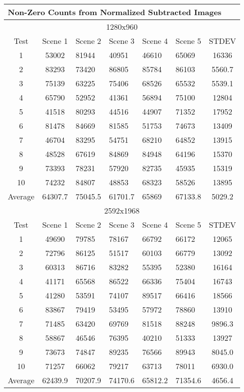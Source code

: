 \begin{table}
\begin{tabular}{| c | c | l | l | l | l | c | }
\hline
\multicolumn{7}{|l|}{\bf Non-Zero Counts from Normalized Subtracted Images} \\
\hline
\hline
\multicolumn{7}{|c|}{1280x960}\\
\hline
Test	&Scene 1	&Scene 2	&Scene 3	&Scene 4	&Scene 5	&STDEV\\\hline
1	&53002	&81944	&40951	&46610	&65069	&16336\\
2	&83293	&73420	&86805	&85784	&86103	&5560.7\\
3	&75139	&63225	&75406	&68526	&65532	&5539.1\\
4	&65790	&52952	&41361	&56894	&75100	&12804\\
5	&41518	&80293	&44516	&44907	&71352	&17952\\
6	&81478	&84669	&81585	&51753	&74673	&13409\\
7	&46704	&83295	&54751	&68210	&64852	&13915\\
8	&48528	&67619	&84869	&84948	&64196	&15370\\
9	&73393	&78231	&57920	&82735	&45935	&15319\\
10	&74232	&84807	&48853	&68323	&58526	&13895\\\hline
Average	&64307.7	&75045.5	&61701.7	&65869	&67133.8	&5029.2\\
\hline
 \hline 
\multicolumn{7}{|c|}{2592x1968}\\
\hline
Test	&Scene 1	&Scene 2	&Scene 3	&Scene 4	&Scene 5	&STDEV\\\hline
1	&49690	&79785	&78167	&66792	&66172	&12065\\
2	&72796	&86125	&51517	&60103	&66779	&13092\\
3	&60313	&86716	&83282	&55395	&52380	&16164\\
4	&41171	&65568	&86522	&66336	&75404	&16743\\
5	&41280	&53591	&74107	&89517	&66416	&18566\\
6	&83867	&79419	&53495	&57972	&78860	&13910\\
7	&71485	&63420	&69769	&81518	&88248	&9896.3\\
8	&58867	&46546	&76395	&40210	&51333	&13927\\
9	&73673	&74847	&89235	&76566	&89943	&8045.0\\
10	&71257	&66062	&79217	&63713	&78011	&6930.0\\
Average	&62439.9	&70207.9	&74170.6	&65812.2	&71354.6	&4656.4\\\hline
\end{tabular}
\caption{}
\label{tab:normalised-images}
\end{table}
%